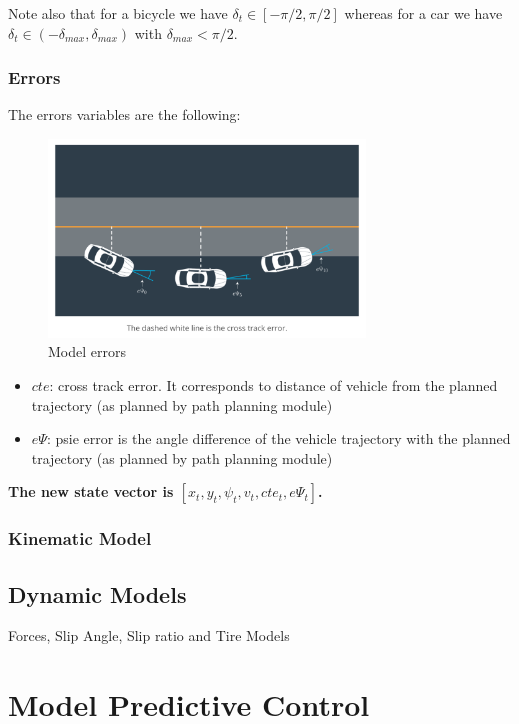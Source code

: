 \documentclass[11pt]{article}
\begin{document}
Note also that for a bicycle we have $\delta_t  \in [-\pi / 2, \pi / 2]$ whereas for a car we have $\delta_t  \in (-\delta_{max}, \delta_{max})$ with $\delta_{max} < \pi / 2$.


\subsubsection{Errors}

The errors variables are the following:
\begin{figure}[h]
    \centering
    \includegraphics[width=0.75\textwidth]{errors}
    \caption{Model errors}
    \label{fig:errors}
\end{figure}
\FloatBarrier

\begin{itemize}
\item $cte$: cross track error. It corresponds to distance of vehicle from the planned trajectory (as planned by path planning module)
\item $e\Psi$: psie error is the angle difference of the vehicle trajectory with the planned trajectory (as planned by path planning module)
\end{itemize}

\textbf{The new state vector is $[x_t, y_t, \psi_t, v_t, cte_t, e\Psi_t]$.
}
\subsubsection{Kinematic Model}


\subsection{Dynamic Models}


Forces, Slip Angle, Slip ratio and Tire Models


\section{Model Predictive Control}
\end{document}
